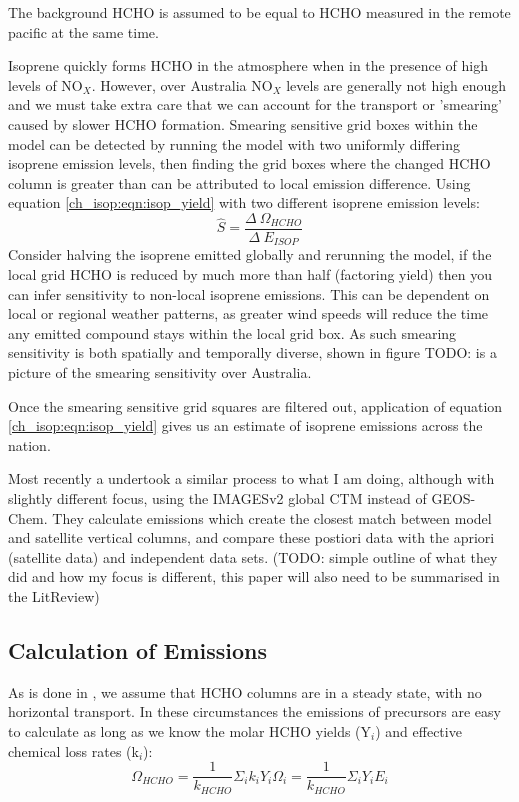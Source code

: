     The background HCHO is assumed to be equal to HCHO measured in the remote pacific at the same time.
    
    Isoprene quickly forms HCHO in the atmosphere when in the presence of high levels of NO$_X$.
    However, over Australia NO$_X$ levels are generally not high enough and we must take extra care that we can account for the transport or 'smearing' caused by slower HCHO formation.
    Smearing sensitive grid boxes within the model can be detected by running the model with two uniformly differing isoprene emission levels, then finding the grid boxes where the changed HCHO column is greater than can be attributed to local emission difference.
    Using equation \ref{ch_isop:eqn:isop_yield} with two different isoprene emission levels:
    \begin{equation*}
      \hat{S} = \frac{\Delta~\Omega_{HCHO}}{\Delta~E_{ISOP}}
    \end{equation*}
    Consider halving the isoprene emitted globally and rerunning the model, if the local grid HCHO is reduced by much more than half (factoring yield) then you can infer sensitivity to non-local isoprene emissions.
    This can be dependent on local or regional weather patterns, as greater wind speeds will reduce the time any emitted compound stays within the local grid box.
    As such smearing sensitivity is both spatially and temporally diverse, shown in figure TODO: is a picture of the smearing sensitivity over Australia.
   
    Once the smearing sensitive grid squares are filtered out, application of equation \ref{ch_isop:eqn:isop_yield} gives us an estimate of isoprene emissions across the nation.
    
    Most recently a \citet{Bauwens2016} undertook a similar process to what I am doing, although with slightly different focus, using the IMAGESv2 global CTM instead of GEOS-Chem.
    They calculate emissions which create the closest match between model and satellite vertical columns, and compare these postiori data with the apriori (satellite data) and independent data sets.
    (TODO: simple outline of what they did and how my focus is different, this paper will also need to be summarised in the LitReview)
    
  \subsection{Calculation of Emissions}
    \label{ch_isop:sec:EmissionCalculation}
    As is done in \citet{Palmer2003, Millet2006, Bauwens2016}, we assume that HCHO columns are in a steady state, with no horizontal transport.
    In these circumstances the emissions of precursors are easy to calculate as long as we know the molar HCHO yields (Y$_i$) and effective chemical loss rates (k$_i$):
    \begin{equation}
      \Omega_{HCHO} = \frac{1}{k_{HCHO}}\Sigma_i k_i Y_i \Omega_i = \frac{1}{k_{HCHO}}\Sigma_i Y_i E_i
    \end{equation}
    
